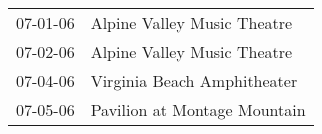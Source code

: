 \begin{supertabular}{p{0.25\columnwidth}p{0.75\columnwidth}}
 07-01-06 &   Alpine Valley Music Theatre \\
 07-02-06 &   Alpine Valley Music Theatre \\
 07-04-06 &   Virginia Beach Amphitheater \\
 07-05-06 &  Pavilion at Montage Mountain \\
\end{supertabular}
